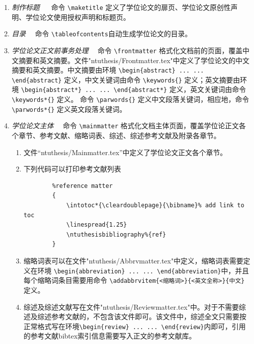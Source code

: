 \begin{enumerate}
\item \emph{制作标题} ~~ 命令 \verb|\maketitle| 定义了学位论文的扉页、学位论文原创性声明、学位论文使用授权声明和标题页。
\item \emph{目录}~~ 命令 \verb|\tableofcontents|自动生成学位论文的目录。
\item \emph{学位论文正文前事务处理}~~ 命令 \verb|\frontmatter| 格式化文档前的页面，覆盖中文摘要和英文摘要。文件"ntuthesis/Frontmatter.tex"中定义了学位论文的中文摘要和英文摘要。中文摘要由环境 \verb|\begin{abstract} ... ... \end{abstract}| 定义，中文关键词由命令 \verb|\keywords{}| 定义；英文摘要由环境 \verb|\begin{abstract*} ... ... \end{abstract*}| 定义，英文关键词由命令 \verb|\keywords*{}| 定义。 命令 \verb|\parwords{}| 定义中文段落关键词，相应地，命令 \verb|\parwords*{}| 定义英文段落关键词。
\item \emph{学位论文主体}~~ 命令 \verb|\mainmatter| 格式化文档主体页面，覆盖学位论正文各个章节、参考文献、缩略词表、综述、综述参考文献及附录各章节。
    \begin{enumerate}
    \item 文件“ntuthesis/Mainmatter.tex”中定义了学位论文正文各个章节。
    \item 下列代码可以打印参考文献列表
        \begin{verbatim}
        %reference matter
        {
            \intotoc*{\cleardoublepage}{\bibname}% add link to toc
            \linespread{1.25}
            \ntuthesisbibliography%{ref}
        }
        \end{verbatim}
    \item 缩略词表可以在文件"ntuthesis/Abbrvmatter.tex"中定义，缩略词表需要定义在环境 \verb|\begin{abbreviation} ... ... \end{abbreviation}|中，并且每个缩略词条目需要用命令 \verb|\addabbrvitem{<缩略词>}{<英文全称>}{中文}| 定义。
    \item 综述及综述文献写在文件"ntuthesis/Reviewmatter.tex"中。对于不需要综述及综述参考文献的，不包含该文件即可。该文件中，综述全文只需要按正常格式写在环境\verb|\begin{review} ... ... \end{review}|内即可，引用的参考文献bibtex索引信息需要写入正文的参考文献库。

\end{enumerate}
\end{enumerate}
